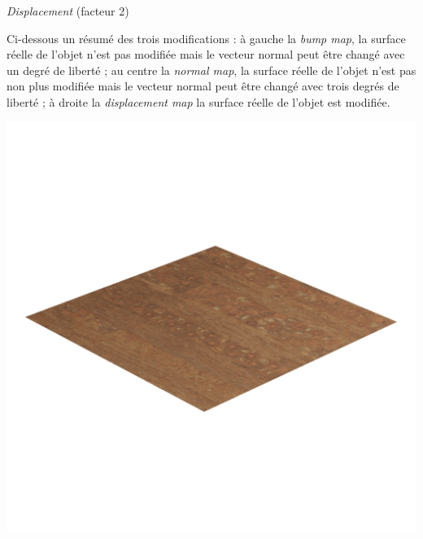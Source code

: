 \documentclass[11pt,class=report,crop=false]{standalone}
\begin{document}
\begin{center}
\begin{minipage}{0.32\textwidth}
		\emph{Displacement} (facteur 2)	
	\end{minipage}	
\end{center}

Ci-dessous un résumé des trois modifications : 
à gauche la \emph{bump map}, la surface réelle de l'objet n'est pas modifiée mais le vecteur normal peut être changé avec un degré de liberté ; 
au centre la \emph{normal map}, la surface réelle de l'objet n'est pas non plus modifiée mais le vecteur normal peut être changé avec trois degrés de liberté ;
à droite la \emph{displacement map} la surface réelle de l'objet est modifiée.

\begin{center}
\begin{minipage}{0.32\textwidth}	
	\center
	\includegraphics[scale=\myscale,scale=0.15,trim={0 8cm 0 8cm},clip]{figures/texture-wood-flat}
	

\end{minipage}
\end{center}
\end{document}
